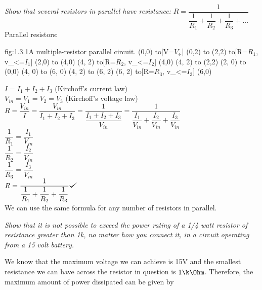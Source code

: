 \documentclass{article}
\def\checkmark{\tikz\fill[scale=0.4](0,.35) -- (.25,0) -- (1,.7) -- (.25,.15) -- cycle;}
\begin{document}
    \textit{Show that several resistors in parallel have resistance:}
        $R = \dfrac{1}{\dfrac{1}{R_{1}} + \dfrac{1}{R_{2}} + \dfrac{1}{R_{3}} + ...} $ \\


        Parallel resistors:
        \begin{circuit}{fig:1.3.1}{A multiple-resistor parallel circuit.}
            (0,0) to[V=$V_\in$] (0,2)
                to (2,2)
                to[R=$R_1$,  v_<=$I_{1}$] (2,0)
                to (4,0)
                (4, 2) to[R=$R_2$,  v_<=$I_{2}$] (4,0)
                (4, 2) to (2,2)
                (2, 0) to (0,0)
                (4, 0) to (6, 0)
                (4, 2) to (6, 2)
                (6, 2) to[R=$R_3$,  v_<=$I_{3}$] (6,0)
        \end{circuit}

        $I = I_{1} + I_{2} + I_{3}$ (Kirchoff's current law)\\

        $V_{in} = V_{1} =  V_{2} = V_{3}$ (Kirchoff's voltage law)\\

        $R = \dfrac{V_{in}}{I} = \dfrac{V_{in}}{I_{1} + I_{2} + I_{3}} = \dfrac{1}{\dfrac{I_{1} + I_{2} + I_{3}}{V_{in}}} = \dfrac{1}{\dfrac{I_{1}}{V_{in}} + \dfrac{I_{2}}{V_{in}} + \dfrac{I_{3}}{V_{in}}}$  \\

        $\dfrac{1}{R_{1}} = \dfrac{I_{1}}{V_{in}}$ \\

        $\dfrac{1}{R_{2}} = \dfrac{I_{2}}{V_{in}}$ \\

        $\dfrac{1}{R_{3}} = \dfrac{I_{3}}{V_{in}}$ \\

        $R = \dfrac{1}{\dfrac{1}{R_{1}} + \dfrac{1}{R_{2}} + \dfrac{1}{R_{3}}} \checkmark $ \\

        \bigskip
        We can use the same formula for any number of resistors in parallel.

    \textit{Show that it is not possible to exceed the power rating of a 1/4 watt resistor of resistance greater than 1k, no matter how you connect it, in a circuit operating from a 15 volt battery.}
    \bigskip

    We know that the maximum voltage we can achieve is 15V and the smallest resistance we can have across the resistor in question is $1\k\Ohm$. Therefore, the maximum amount of power dissipated can be given by 
\end{document}
